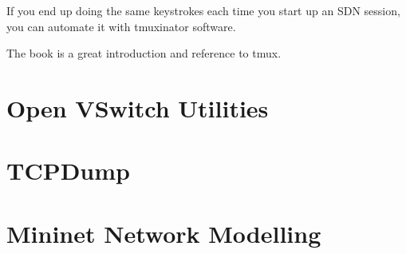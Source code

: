 If you end up doing the same keystrokes each time you start up an SDN session, you can automate it
with tmuxinator software.

The book \citet{hogan:tmux} is a great introduction and reference to tmux.  

\section{Open VSwitch Utilities}

\section{TCPDump}
 \label{sdn_development_tools:tcpdump}

\section{Mininet Network Modelling}

